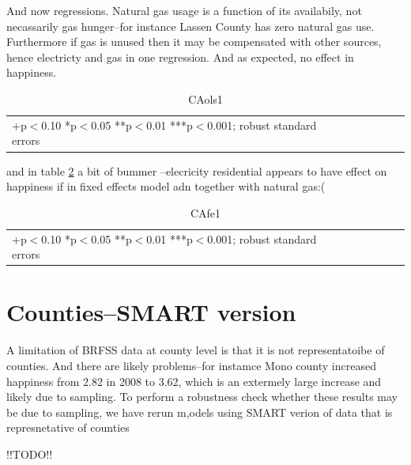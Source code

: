 \documentclass[10pt, letterpaper]{article}
\begin{document}
\begin{spacing}{1.4}
\begin{spacing}{.8}
\begin{verbatim}
\end{verbatim}
\end{spacing}


And now regressions. Natural gas usage is a function of its availabily, not
necassarily gas hunger--for instance Lassen County has zero natural gas
use. Furthermore if gas is unused then it may be compensated with other sources,
hence electricty and gas in one regression. And as expected, no effect in
happiness. 

\begin{table}[H]\centering \caption{CAols1} \label{CAols1} \begin{scriptsize} \begin{tabular}{p{1.4in}p{.43in}p{.43in}p{.43in}p{.43in}p{.43in}p{.43in}p{.43in}p{.43in}p{.43in}p{.43 in}p{.43in}p{.43 in}}\hline  \hline\multicolumn{6}{l}{+p$<$0.10 *p$<$0.05 **p$<$0.01 ***p$<$0.001; robust standard errors} \end{tabular}\end{scriptsize}\end{table}


and in table \ref{CAfe1} a bit of bummer --elecricity residential appears to
have effect on happiness if in fixed effects model adn together with natural gas:(
\begin{table}[H]\centering \caption{CAfe1} \label{CAfe1} \begin{scriptsize} \begin{tabular}{p{1.4in}p{.43in}p{.43in}p{.43in}p{.43in}p{.43in}p{.43in}p{.43in}p{.43in}p{.43in}p{.43 in}p{.43in}p{.43 in}}\hline  \hline\multicolumn{6}{l}{+p$<$0.10 *p$<$0.05 **p$<$0.01 ***p$<$0.001; robust standard errors} \end{tabular}\end{scriptsize}\end{table}
\section{Counties--SMART version}

A limitation of BRFSS data at county level is that it is not representatoibe of
counties. And there are likely problems--for instamce Mono county increased
happiness from 2.82 in 2008 to 3.62, which is an extermely large increase and
likely due to sampling. To perform a robustness check whether these results may
 be due to sampling, we have rerun m,odels using SMART verion of data that is
 represnetative of counties

!!TODO!!  




\end{spacing}
\end{document}
